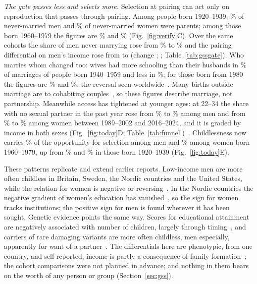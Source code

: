 \emph{The gate passes less and selects more.} Selection at pairing can act only on reproduction that passes through
pairing. Among people born 1920--1939, \GssGateMOld\% of never-married men and \GssGateWOld\% of never-married women were
parents; among those born 1960--1979 the figures are \GssGateMNew\% and \GssGateWNew\% (Fig.~\ref{fig:verify}C). Over the
same cohorts the share of men never marrying rose from \GssNevMOld\% to \GssNevMNew\% and the pairing differential on
men's income rose from \GssPairMOld{} to \GssPairMNew{} (change \GssPairMChange; \GssPairMChangeCI;
Table~\ref{tab:gssgate}). Who marries whom changed too: wives had more schooling than their husbands in \GssHypMoreMid\% of
marriages of people born 1940--1959 and less in \GssHypLessMid\%; for those born from 1980 the figures are
\GssHypMoreYoung\% and \GssHypLessYoung\%, the reversal seen worldwide~\cite{esteve2016}. Many births outside marriage are
to cohabiting couples~\cite{lundberg2016}, so these figures describe marriage, not partnership. Meanwhile access has
tightened at younger ages: at 22--34 the share with no sexual partner in the past year rose from \GssPlMOld\% to
\GssPlMNew\% among men and from \GssPlWOld\% to \GssPlWNew\% among women between 1989--2002 and 2016--2024, and it is graded
by income in both sexes (Fig.~\ref{fig:today}D; Table~\ref{tab:funnel})~\cite{ueda2020}. Childlessness now carries
\GssShareMNew\% of the opportunity for selection among men and \GssShareWNew\% among women born 1960--1979, up from
\GssShareMOld\% and \GssShareWOld\% in those born 1920--1939 (Fig.~\ref{fig:today}E).

These patterns replicate and extend earlier reports. Low-income men are more often childless in Britain, Sweden, the Nordic
countries and the United States, while the relation for women is negative or
reversing~\cite{nettle2008,fieder2007,barthold2012,hopcroft2021,weeden2006,kolk2023,jalovaara2019,kolk2019}. In the Nordic countries the
negative gradient of women's education has vanished~\cite{jalovaara2019}, so the sign for women tracks institutions; the
positive sign for men is found wherever it has been sought. Genetic evidence points the same way. Scores for educational
attainment are negatively associated with number of children, largely through timing~\cite{kong2017,beauchamp2016,hughjones2022},
and carriers of rare damaging variants are more often childless, men especially, apparently for want of a
partner~\cite{gardner2022}. The differentials here are phenotypic, from one country, and self-reported; income is partly a
consequence of family formation~\cite{kleven2019}; the cohort comparisons were not planned in advance; and nothing in them
bears on the worth of any person or group (Section~\ref{sec:gss}).

